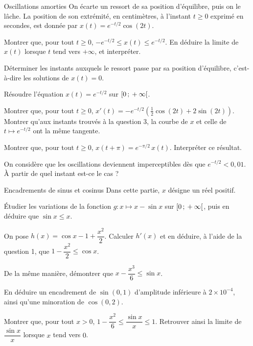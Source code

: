 \begin{exercice}[3]{Oscillations amorties}
On écarte un ressort de sa position d'équilibre, puis on le lâche. La position de son extrémité, en centimètres, à
l'instant $t\geq0$ exprimé en secondes, est donnée par $x(t)=e^{-t/2}\cos(2t)$.
\begin{questions}
  \item Montrer que, pour tout $t\geq0$, $-e^{-t/2}\leq x(t)\leq e^{-t/2}$. En déduire la limite de $x(t)$ lorsque $t$ tend vers $+\infty$, et interpréter.
  \item Déterminer les instants auxquels le ressort passe par sa position d'équilibre, c'est-à-dire les solutions de $x(t)=0$.
  \item Résoudre l'équation $x(t)=e^{-t/2}$ sur $\mathopen{[}0\,{;}\,+\infty\mathclose{[}$.
\end{questions}
\begin{questions}[resume]
  \item Montrer que, pour tout $t\geq0$, $x'(t)=-e^{-t/2}\left(\frac12\cos(2t)+2\sin(2t)\right)$. Montrer qu'aux instants trouvés
    à la question 3, la courbe de $x$ et celle de $t\mapsto e^{-t/2}$ ont la même tangente.
  \item Montrer que, pour tout $t\geq0$, $x(t+\pi)=e^{-\pi/2}\,x(t)$. Interpréter ce résultat.
  \item On considère que les oscillations deviennent imperceptibles dès que $e^{-t/2}<0{,}01$. À partir de quel instant est-ce le cas ?
\end{questions}
\end{exercice}

\begin{exercice}[3]{Encadrements de sinus et cosinus}
Dans cette partie, $x$ désigne un réel positif.
\begin{questions}
  \item Étudier les variations de la fonction $g:x\mapsto x-\sin x$ sur $\mathopen{[}0\,{;}\,+\infty\mathclose{[}$, puis en déduire que $\sin x\leq x$.
  \item On pose $h(x)=\cos x-1+\dfrac{x^{2}}{2}$. Calculer $h'(x)$ et en déduire, à l'aide de la question 1, que
    $1-\dfrac{x^{2}}{2}\leq\cos x$.
  \item De la même manière, démontrer que $x-\dfrac{x^{3}}{6}\leq\sin x$.
\end{questions}
\begin{questions}[resume]
  \item En déduire un encadrement de $\sin(0{,}1)$ d'amplitude inférieure à $2\times10^{-4}$, ainsi qu'une minoration de $\cos(0{,}2)$.
  \item Montrer que, pour tout $x>0$, $1-\dfrac{x^{2}}{6}\leq\dfrac{\sin x}{x}\leq1$. Retrouver ainsi la limite de $\dfrac{\sin x}{x}$
    lorsque $x$ tend vers $0$.
\end{questions}
\end{exercice}
